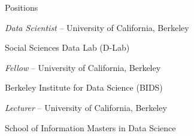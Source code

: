 \begin{rubric}{Positions}

\entry*[2013--present] \emph{Data Scientist} -- University of California, Berkeley
\par Social Sciences Data Lab (D-Lab)

\entry*[2014--present] \emph{Fellow} -- University of California, Berkeley
\par Berkeley Institute for Data Science (BIDS)

\entry*[2014--present] \emph{Lecturer} -- University of California, Berkeley
\par School of Information Masters in Data Science

\end{rubric}
